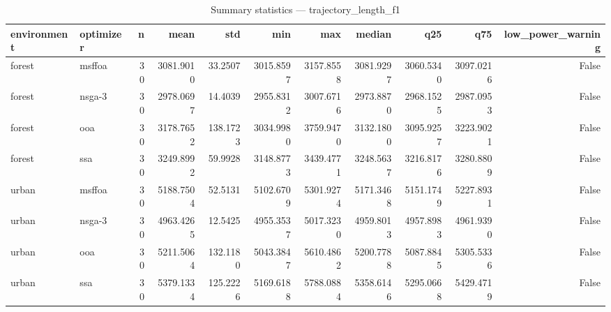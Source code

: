 \begin{table}
\caption{Summary statistics — trajectory_length_f1}
\label{tab:summary-trajectory_length_f1}
\begin{tabular}{llrrrrrrrrr}
\toprule
environment & optimizer & n & mean & std & min & max & median & q25 & q75 & low\_power\_warning \\
\midrule
forest & msffoa & 30 & 3081.9010 & 33.2507 & 3015.8597 & 3157.8558 & 3081.9297 & 3060.5340 & 3097.0216 & False \\
forest & nsga-3 & 30 & 2978.0697 & 14.4039 & 2955.8312 & 3007.6716 & 2973.8870 & 2968.1525 & 2987.0953 & False \\
forest & ooa & 30 & 3178.7652 & 138.1723 & 3034.9980 & 3759.9470 & 3132.1800 & 3095.9257 & 3223.9021 & False \\
forest & ssa & 30 & 3249.8992 & 59.9928 & 3148.8773 & 3439.4771 & 3248.5637 & 3216.8176 & 3280.8809 & False \\
urban & msffoa & 30 & 5188.7504 & 52.5131 & 5102.6709 & 5301.9274 & 5171.3468 & 5151.1749 & 5227.8931 & False \\
urban & nsga-3 & 30 & 4963.4265 & 12.5425 & 4955.3537 & 5017.3230 & 4959.8013 & 4957.8983 & 4961.9390 & False \\
urban & ooa & 30 & 5211.5064 & 132.1180 & 5043.3847 & 5610.4862 & 5200.7788 & 5087.8845 & 5305.5336 & False \\
urban & ssa & 30 & 5379.1334 & 125.2226 & 5169.6188 & 5788.0884 & 5358.6146 & 5295.0668 & 5429.4719 & False \\
\bottomrule
\end{tabular}
\end{table}

